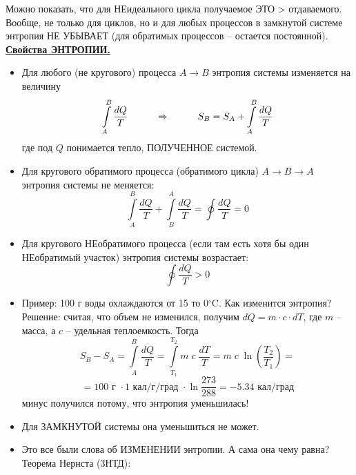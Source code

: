 \documentclass[12pt,epsfig,color,russian]{article}
\begin{document}
Можно показать, что для НЕидеального цикла получаемое ЭТО > отдаваемого. Вообще, не только для циклов, но и для любых процессов в замкнутой системе энтропия НЕ УБЫВАЕТ (для обратимых процессов -- остается постоянной).
\newpage
\underline{\bf Свойства ЭНТРОПИИ.}
\begin{itemize}
 \item Для любого (не кругового) процесса $A\rightarrow B$ энтропия системы изменяется на величину
     \begin{displaymath}
     \int\limits_A^B\frac{dQ}{T}\hspace{10mm}\Rightarrow\hspace{10mm}
     S_B=S_A+\int\limits_A^B\frac{dQ}{T}
     \end{displaymath}
     где под $Q$ понимается тепло, ПОЛУЧЕННОЕ системой.
 \item Для кругового обратимого процесса (обратимого цикла) $A\rightarrow B\rightarrow A$ энтропия системы не меняется:
     \begin{displaymath}
     \int\limits_A^B\frac{dQ}{T}+\int\limits_B^A\frac{dQ}{T}=\oint\frac{dQ}{T}=0
     \end{displaymath}
 \item Для кругового НЕобратимого процесса (если там есть хотя бы один НЕобратимый участок) энтропия системы возрастает:
     \begin{displaymath}
     \oint\frac{dQ}{T}>0
     \end{displaymath}
 \item Пример: 100 г воды охлаждаются от 15 то 0$^\circ$C. Как изменится энтропия?\\
     Решение: считая, что объем не изменился, получим $dQ=m\cdot c\cdot dT$, где $m$ -- масса, а $c$ -- удельная теплоемкость. Тогда
     \begin{displaymath}
     S_B-S_A=\int\limits_A^B\frac{dQ}{T}=\int\limits_{T_1}^{T_2}m\;c\;\frac{dT}{T}=
     m\;c\;\ln\left(\frac{T_2}{T_1}\right)=
     \end{displaymath}
     \begin{displaymath}
     =100\texttt{ г }\cdot1\texttt{ кал/г/град }\cdot\ln\frac{273}{288}=-5.34\texttt{ кал/град}
     \end{displaymath}
     минус получился потому, что энтропия уменьшилась!
  \item Для ЗАМКНУТОЙ системы она уменьшиться не может.
  \item Это все были слова об ИЗМЕНЕНИИ энтропии. А сама она чему равна? Теорема Нернста (3НТД):
      \begin{center}
      \end{center}
 \end{itemize}
\end{document}
